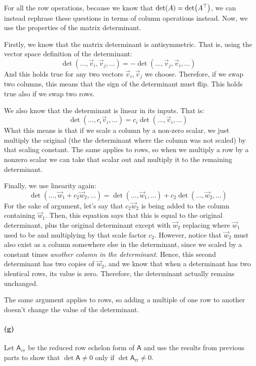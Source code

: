 \documentclass{article}
\begin{document}
\begin{solution}
	For all the row operations, because we know that $\det(A) = \det(A^\top)$, we can instead rephrase these 
	questions in terms of column operations instead. Now, we use the properties of the matrix determinant. 

	Firstly, we know that the matrix determinant is antisymmetric. That is, using the vector space 
	definition of the determinant:
	\[
	\det(\dots, \vec v_i, \vec v_j, \dots) = -\det(\dots, \vec v_j, \vec v_i, \dots)
	\] 
	And this holds true for any two vectors $\vec v_i, \vec v_j$ we choose. Therefore, if we swap two columns,
	this means that the sign of the determinant must flip. This holds true also if we swap two rows.

	We also know that the determinant is linear in its inputs. That is:
	\[
	\det(\dots, c_i\vec v_i, \dots) = c_i \det(\dots, \vec v_i, \dots) 
	\] 
	What this means is that if we scale a column by a non-zero scalar, we just multiply the original (the 
	the determinant where the column was not scaled) by that scaling constant. The same applies to rows, so when
	we multiply a row by a nonzero scalar we can take that scalar out and multiply it to the remaining
	determinant. 

	Finally, we use linearity again:
	\[
	\det(\dots, \vec w_1 + c_2 \vec w_2, \dots) = \det(\dots, \vec w_1, \dots) + 
	c_2 \det(\dots, \vec w_2, \dots)
	\] 
	For the sake of argument, let's say that $c_2 \vec w_2$ is being added to the column containing $\vec w_1$.
	Then, this equation
	says that this is equal to the original determinant, plus the original determinant except with $\vec w_2$
	replacing where $\vec w_1$ used to be and multiplying by that scale factor $c_2$. However, notice that 
	$\vec w_2$ must also exist as a column somewhere else in the determinant, since we scaled by a constant
	times \textit{another column in the determinant}. Hence, this second determinant has two copies of 
	$\vec w_2$, and we know that when a determinant has two identical rows, its value is zero. Therefore, 
	the determinant actually remains unchanged. 

	The same argument applies to rows, so adding a multiple of one row to another doesn't change the value of 
	the determinant. 
\end{solution}

\paragraph{(g)}	\extrapart
Let $\mathsf{A}_{rr}$ be the reduced row echelon form of $\mathsf{A}$ and use the results from previous parts to show that $\det{\mathsf{A}}\neq 0$ only if 
$\det{\mathsf{A}_{\textrm{rr}}}\neq 0$.
\end{document}
